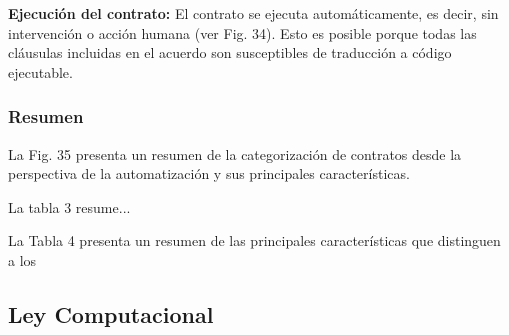 \documentclass[12pt]{report} %
\begin{document}
\begin{itemize}
\textbf{Ejecución del contrato:} El contrato se ejecuta automáticamente, es decir, sin intervención o acción humana (ver Fig. 34). Esto es posible porque todas las cláusulas incluidas en el acuerdo son susceptibles de traducción a código ejecutable.

\subsubsection{Resumen}

La Fig. 35 presenta un resumen de la categorización de contratos desde la perspectiva de la automatización y sus principales características.

	La tabla 3 resume...
 
	La Tabla 4 presenta un resumen de las principales características que distinguen a los

\subsection{Ley Computacional}


\end{itemize}
\end{document}

